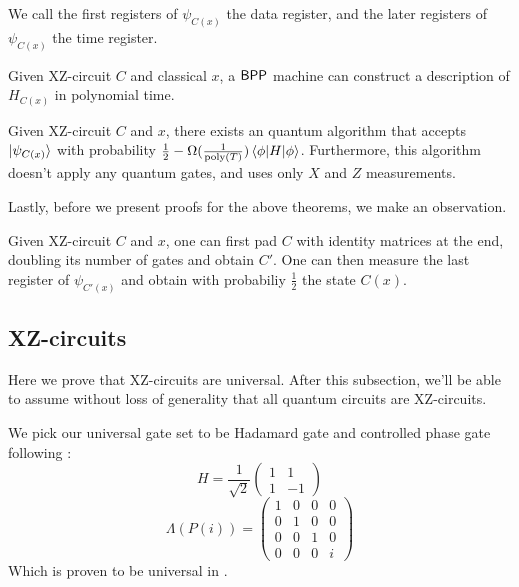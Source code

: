 \begin{definition}
	We call the first registers of $\psi_{C(x)}$ the data register, and the later registers of $\psi_{C(x)}$ the time register.
\end{definition}

\begin{theorem}
	Given XZ-circuit $C$ and classical $x$, a $\operatorname{\mathsf{BPP}}$ machine can construct a description of $H_{C(x)}$ in polynomial time.
\end{theorem}

\begin{theorem}
	Given XZ-circuit $C$ and $x$, there exists an quantum algorithm that accepts $\ket{\psi_{C(x)}}$ with probability $\frac{1}{2}-\Omega(\frac{1}{\operatorname*{\operatorname{poly}}(T)})\braket{\phi|H|\phi}$. Furthermore, this algorithm doesn't apply any quantum gates, and uses only $X$ and $Z$ measurements.
\end{theorem}

Lastly, before we present proofs for the above theorems, we make an observation.

\begin{observation}
	\label{idpadding}
	Given XZ-circuit $C$ and $x$, one can first pad $C$ with identity matrices at the end, doubling its number of gates and obtain $C'$. One can then measure the last register of $\psi_{C'(x)}$ and obtain with probabiliy $\frac{1}{2}$ the state $C(x)$.
\end{observation}

\subsection{XZ-circuits}

Here we prove that XZ-circuits are universal. After this subsection, we'll be able to assume without loss of generality that all quantum circuits are XZ-circuits.

We pick our universal gate set to be Hadamard gate and controlled phase gate following \cite{quant-ph/0301040}:
$$H=\frac{1}{\sqrt{2}}\begin{pmatrix}1&1\\1&-1\end{pmatrix}$$
	$$\Lambda(P(i))=\begin{pmatrix}1&0&0&0\\0&1&0&0\\0&0&1&0\\0&0&0&i\end{pmatrix}$$
		Which is proven to be universal in \cite{kitaev_1997}.

